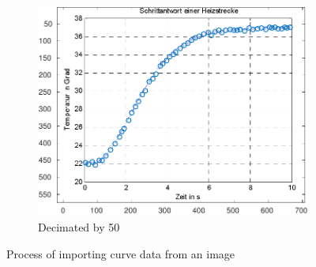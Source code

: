 \begin{figure}
\begin{subfigure}{.5\textwidth}
        \includegraphics[width=\linewidth]{images/scatter_decimated_50}
        \caption{Decimated by 50}
        \label{fig:image:scatter_dec}
    \end{subfigure}
    \caption{Process of importing curve data from an image}
\end{figure}

